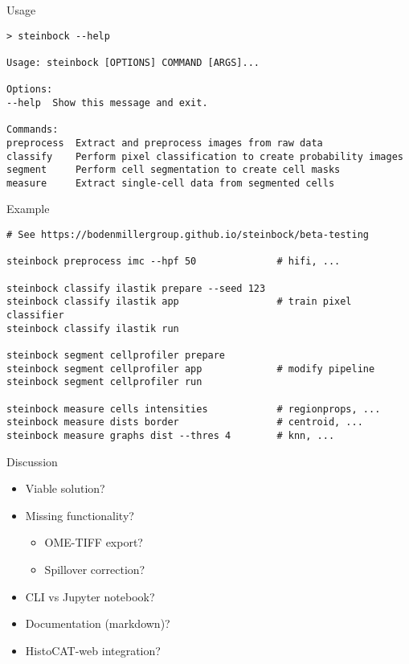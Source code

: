 \documentclass[aspectratio=169]{beamer}
\begin{document}
\begin{frame}[fragile]{Usage}
	
\begin{verbatim}
> steinbock --help

Usage: steinbock [OPTIONS] COMMAND [ARGS]...

Options:
--help  Show this message and exit.

Commands:
preprocess  Extract and preprocess images from raw data
classify    Perform pixel classification to create probability images
segment     Perform cell segmentation to create cell masks
measure     Extract single-cell data from segmented cells
\end{verbatim}
	
\end{frame}


\begin{frame}[fragile]{Example}
	
\begin{verbatim}
# See https://bodenmillergroup.github.io/steinbock/beta-testing

steinbock preprocess imc --hpf 50              # hifi, ...

steinbock classify ilastik prepare --seed 123
steinbock classify ilastik app                 # train pixel classifier
steinbock classify ilastik run

steinbock segment cellprofiler prepare
steinbock segment cellprofiler app             # modify pipeline
steinbock segment cellprofiler run

steinbock measure cells intensities            # regionprops, ...
steinbock measure dists border                 # centroid, ...
steinbock measure graphs dist --thres 4        # knn, ...

\end{verbatim}
	
\end{frame}


\begin{frame}{Discussion}
	
	\begin{itemize}
		\item Viable solution?
		\item Missing functionality?
		\begin{itemize}
			\item OME-TIFF export?
			\item Spillover correction?
		\end{itemize}
		\item CLI vs Jupyter notebook?
		\item Documentation (markdown)?
		\item HistoCAT-web integration?
	\end{itemize}
	
\end{frame}
\end{document}

